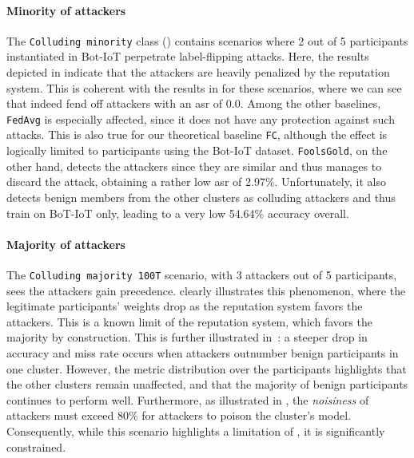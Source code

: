 \paragraph*{Minority of attackers\label{sec:radar.eval.results.flipping.minority}}

The \texttt{Colluding minority} class () contains scenarios where 2 out of 5 participants instantiated in Bot-IoT perpetrate label-flipping attacks.
Here, the results depicted in  indicate that the attackers are heavily penalized by the reputation system. 
This is coherent with the results in  for these scenarios, where we can see that \thecontrib indeed fend off attackers with an \gls{asr} of 0.0.
Among the other baselines, \texttt{FedAvg} is especially affected, since it does not have any protection against such attacks.
This is also true for our theoretical baseline \texttt{FC}, although the effect is logically limited to participants using the Bot-IoT dataset.
\texttt{FoolsGold}, on the other hand, detects the attackers since they are similar and thus manages to discard the attack, obtaining a rather low \gls{asr} of 2.97\%.
Unfortunately, it also detects benign members from the other clusters as colluding attackers and thus train on BoT-IoT only, leading to a very low 54.64\% accuracy overall.


\paragraph*{Majority of attackers\label{sec:radar.eval.results.flipping.majority}}

The \texttt{Colluding majority 100T} scenario, with 3 attackers out of 5 participants, sees the attackers gain precedence.
 clearly illustrates this phenomenon, where the legitimate participants' weights drop as the reputation system favors the attackers.
This is a known limit of the reputation system, which favors the majority by construction.
This is further illustrated in~: a steeper drop in accuracy and miss rate occurs when attackers outnumber benign participants in one cluster.
However, the metric distribution over the participants highlights that the other clusters remain unaffected, and that the majority of benign participants continues to perform well.
Furthermore, as illustrated in , the \emph{noisiness} of attackers must exceed 80\% for attackers to poison the cluster's model.
Consequently, while this scenario highlights a limitation of \thecontrib, it is significantly constrained.


